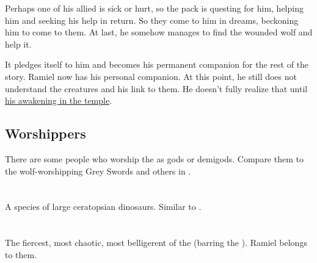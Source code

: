 Perhaps one of his allied \moonwolves{} is sick or hurt, so the pack is questing for him, helping him and seeking his help in return. So they come to him in dreams, beckoning him to come to them. At last, he somehow manages to find the wounded wolf and help it. 

It pledges itself to him and becomes his permanent companion for the rest of the story. Ramiel now has his personal \moonwolf{} companion. At this point, he still does not understand the creatures and his link to them. He doesn't fully realize that until \hyperref[Ramiel's awakening in the temple]{his awakening in the temple}. 







\subsection{Worshippers}
There are some people who worship the \moonwolves{} as gods or demigods. Compare them to the wolf-worshipping Grey Swords and others in \SEMalazan.
















\section{\Mulgrons}
\label{\mulgron}
A species of large ceratopsian dinosaurs. Similar to .















\section{\Mystraacht}
The fiercest, most chaotic, most belligerent of the \resphain{} (barring the \hs\Baelzerach). Ramiel belongs to them. 







